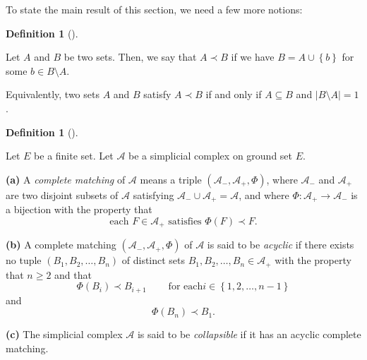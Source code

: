 \documentclass[numbers=enddot,12pt,final,onecolumn]{scrartcl}%
\theoremstyle{definition}
\newtheorem{defi}[theo]{Definition}
\newenvironment{definition}[1][]
{\begin{defi}[#1]\begin{leftbar}}
{\end{leftbar}\end{defi}}
\renewcommand{\geq}{\geqslant}
\begin{document}
To state the main result of this section, we need a few more notions:

\begin{definition}
\label{def.sets.prec}Let $A$ and $B$ be two sets. Then, we say that $A\prec B$
if we have $B=A\cup\left\{  b\right\}  $ for some $b\in B\setminus A$.
\end{definition}

Equivalently, two sets $A$ and $B$ satisfy $A\prec B$ if and only if
$A\subseteq B$ and $\left\vert B\setminus A\right\vert =1$.

\begin{definition}
\label{def.matchings}Let $E$ be a finite set. Let $\mathcal{A}$ be a
simplicial complex on ground set $E$.

\textbf{(a)} A \emph{complete matching} of $\mathcal{A}$ means a triple
$\left(  \mathcal{A}_{-},\mathcal{A}_{+},\Phi\right)  $, where $\mathcal{A}%
_{-}$ and $\mathcal{A}_{+}$ are two disjoint subsets of $\mathcal{A}$
satisfying $\mathcal{A}_{-}\cup\mathcal{A}_{+}=\mathcal{A}$, and where
$\Phi:\mathcal{A}_{+}\rightarrow\mathcal{A}_{-}$ is a bijection with the
property that
\begin{equation}
\text{each }F\in\mathcal{A}_{+}\text{ satisfies }\Phi\left(  F\right)  \prec
F. \label{eq.def.matchings.a.cond}%
\end{equation}


\textbf{(b)} A complete matching $\left(  \mathcal{A}_{-},\mathcal{A}_{+}%
,\Phi\right)  $ of $\mathcal{A}$ is said to be \emph{acyclic} if there exists
no tuple $\left(  B_{1},B_{2},\ldots,B_{n}\right)  $ of distinct sets
$B_{1},B_{2},\ldots,B_{n}\in\mathcal{A}_{+}$ with the property that $n\geq2$
and that%
\[
\Phi\left(  B_{i}\right)  \prec B_{i+1}\ \ \ \ \ \ \ \ \ \ \text{for each
}i\in\left\{  1,2,\ldots,n-1\right\}
\]
and%
\[
\Phi\left(  B_{n}\right)  \prec B_{1}.
\]


\textbf{(c)} The simplicial complex $\mathcal{A}$ is said to be
\emph{collapsible} if it has an acyclic complete matching.
\end{definition}
\end{document}
